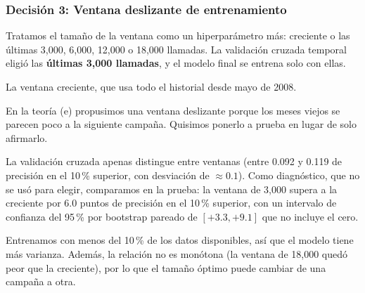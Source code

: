 \documentclass[11pt, letterpaper]{article}
\begin{document}
\subsubsection*{Decisión 3: Ventana deslizante de entrenamiento}
\begin{description}[leftmargin=0pt, itemsep=2pt]
    \item[Decisión.] Tratamos el tamaño de la ventana como un hiperparámetro más: creciente o las últimas 3,000, 6,000, 12,000 o 18,000 llamadas. La validación cruzada temporal eligió las \textbf{últimas 3,000 llamadas}, y el modelo final se entrena solo con ellas.
    \item[Alternativa descartada.] La ventana creciente, que usa todo el historial desde mayo de 2008.
    \item[Por qué.] En la teoría (e) propusimos una ventana deslizante porque los meses viejos se parecen poco a la siguiente campaña. Quisimos ponerlo a prueba en lugar de solo afirmarlo.
    \item[Evidencia.] La validación cruzada apenas distingue entre ventanas (entre 0.092 y 0.119 de precisión en el 10\,\% superior, con desviación de $\approx 0.1$). Como diagnóstico, que no se usó para elegir, comparamos en la prueba: la ventana de 3,000 supera a la creciente por 6.0 puntos de precisión en el 10\,\% superior, con un intervalo de confianza del 95\,\% por bootstrap pareado de $[+3.3, +9.1]$ que no incluye el cero.
    \item[Qué perdemos.] Entrenamos con menos del 10\,\% de los datos disponibles, así que el modelo tiene más varianza. Además, la relación no es monótona (la ventana de 18,000 quedó peor que la creciente), por lo que el tamaño óptimo puede cambiar de una campaña a otra.
\end{description}
\end{document}
